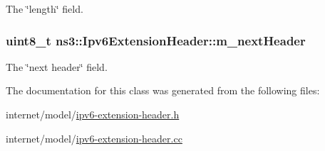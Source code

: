 The \char`\"{}length\char`\"{} field. 

\subsubsection[{\texorpdfstring{m\+\_\+next\+Header}{m_nextHeader}}]{\setlength{\rightskip}{0pt plus 5cm}uint8\+\_\+t ns3\+::\+Ipv6\+Extension\+Header\+::m\+\_\+next\+Header\hspace{0.3cm}{\ttfamily [private]}}\hypertarget{classns3_1_1Ipv6ExtensionHeader_a17e21188b4094d59a1b194d20552ef2e}{}\label{classns3_1_1Ipv6ExtensionHeader_a17e21188b4094d59a1b194d20552ef2e}


The \char`\"{}next header\char`\"{} field. 



The documentation for this class was generated from the following files\+:\begin{DoxyCompactItemize}
\item 
internet/model/\hyperlink{ipv6-extension-header_8h}{ipv6-\/extension-\/header.\+h}\item 
internet/model/\hyperlink{ipv6-extension-header_8cc}{ipv6-\/extension-\/header.\+cc}\end{DoxyCompactItemize}
